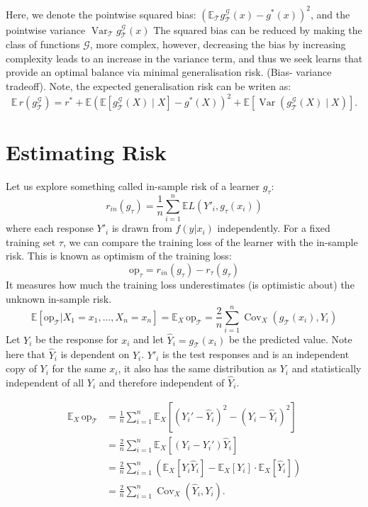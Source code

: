 \documentclass[12pt]{article}
\begin{document}
Here, we denote the pointwise squared bias: $ \left( \mathbb{E}_{\mathcal{T}} g^{\mathcal{G}}_{\mathcal{T}}(x) - g^*(x) \right)^2$, and the pointwise variance $\operatorname{Var}_{\mathcal{T}} g^{\mathcal{G}}_{\mathcal{T}}(x)$
The squared bias can be reduced by making the class of functions $
\mathcal{G}$, more complex, however, decreasing the bias by increasing complexity leads to an increase in the variance term, and thus we seek learns that provide an optimal balance via minimal generalisation risk. (Bias- variance tradeoff). Note, the expected generalisation risk can be writen as:
\[
\mathbb{E}\, r(g^{\mathcal{G}}_{\mathcal{T}}) 
= r^* + \mathbb{E}\left( \mathbb{E}[g^{\mathcal{G}}_{\mathcal{T}}(X) \mid X] - g^*(X) \right)^2 
+ \mathbb{E}\left[ \operatorname{Var}(g^{\mathcal{G}}_{\mathcal{T}}(X) \mid X) \right].
\]
\section{Estimating Risk}
Let us explore something called in-sample risk of a learner $g_{\mathcal{\tau}}$:
\[r_{in}(g_\tau)=\frac{1}{n}\sum_{i=1}^n\mathbb{E}L(Y'_i,g_{\tau}(x_i))\]
where each response $Y'_i$ is drawn from $f(y|x_i)$ independently. For a fixed training set $\tau$, we can compare the training loss of the learner with the in-sample risk. This is known as optimism of the training loss:
\[\text{op}_\tau = r_{in}(g_\tau) - r_\tau(g_\tau)\]
It measures how much the training loss underestimates (is optimistic about) the unknown in-sample risk. 
\[\mathbb{E}[\text{op}_\mathcal{T}|X_1 = x_1,\dots, X_n= x_n] =  \mathbb{E}_X \, \mathrm{op}_{\mathcal{T}} 
= \frac{2}{n} \sum_{i=1}^n \operatorname{Cov}_X(g_{\mathcal{T}}(x_i), Y_i)\]
Let $Y_i$ be the response for $x_i$ and let $\hat{Y}_i = g_\mathcal{T}(x_i)$ be the predicted value. Note here that $\hat{Y}_i$ is dependent on $Y_i$. $Y'_i$ is the test responses and is an independent copy of $Y_i$ for the same $x_i$, it also has the same distribution as $Y_i$ and statistically independent of all {$Y_i$} and therefore independent of $\hat{Y}_i$.

\begin{align*}
\mathbb{E}_X \, \text{op}_{\mathcal{T}} 
&= \frac{1}{n} \sum_{i=1}^{n} \mathbb{E}_X \left[ (Y_i' - \widehat{Y}_i)^2 - (Y_i - \widehat{Y}_i)^2 \right] \\
&= \frac{2}{n} \sum_{i=1}^{n} \mathbb{E}_X \left[ (Y_i - Y_i') \widehat{Y}_i \right] \\
&= \frac{2}{n} \sum_{i=1}^{n} \left( \mathbb{E}_X [Y_i \widehat{Y}_i] - \mathbb{E}_X [Y_i] \cdot \mathbb{E}_X [\widehat{Y}_i] \right) \\
&= \frac{2}{n} \sum_{i=1}^{n} \operatorname{Cov}_X (\widehat{Y}_i, Y_i).
\end{align*}
\end{document}
